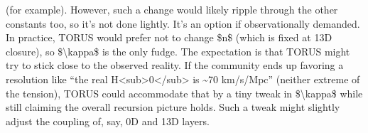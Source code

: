 \documentclass[]{article}
\begin{document}
\begin{enumerate}
  (for example). However, such a change would likely ripple through the
  other constants too, so it's not done lightly. It's an option if
  observationally demanded. In practice, TORUS would prefer not to
  change \$n\$ (which is fixed at 13D closure), so
  \$\textbackslash{}kappa\$ is the only fudge. The expectation is that
  TORUS might try to stick close to the observed reality. If the
  community ends up favoring a resolution like ``the real
  H\textless{}sub\textgreater{}0\textless{}/sub\textgreater{} is
  \textasciitilde{}70 km/s/Mpc'' (neither extreme of the tension), TORUS
  could accommodate that by a tiny tweak in \$\textbackslash{}kappa\$
  while still claiming the overall recursion picture holds​. Such a
  tweak might slightly adjust the coupling of, say, 0D and 13D layers.
\end{enumerate}
\end{document}

